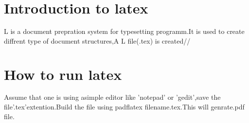 \documentclass[a5paper,50pt]{article}
\begin{document}
   \section{Introduction to latex}
   L is a document prepration system for typesetting programm.It is used to create diffrent type of document structures,A L file(.tex) is created//
   \section{How to run latex}
   Assume that one is using asimple editor like 'notepad' or 'gedit',save the file'.tex'extention.Build the file using padflatex filename.tex.This will genrate.pdf file.\\
\end{document}
